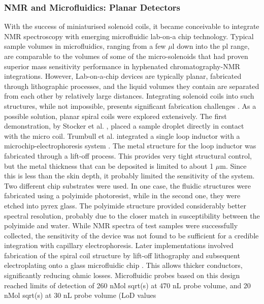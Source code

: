 \subsubsection{NMR and Microfluidics: Planar
Detectors}\label{nmr-and-microfluidics-planar-detectors}

With the success of miniaturised solenoid coils, it became conceivable
to integrate NMR spectroscopy with emerging microfluidic lab-on-a chip
technology. Typical sample volumes in microfluidics, ranging from a few
$\mu$l down into the pl range, are comparable to the volumes of some of
the micro-solenoids that had proven superior mass sensitivity
performance in hyphenated chromatography-NMR integrations. However,
Lab-on-a-chip devices are typically planar, fabricated through
lithographic processes, and the liquid volumes they contain are
separated from each other by relatively large distances. Integrating
solenoid coils into such structures, while not impossible, presents
significant fabrication challenges \cite{Badilita:2010hb}. As a possible
solution, planar spiral coils were explored extensively. The first
demonstration, by Stocker et al. \cite{Stocker:1997by}, placed a sample
droplet directly in contact with the micro coil. Trumbull et al.
integrated a single loop inductor with a microchip-electrophoresis
system \cite{Trumbull:2000vb}. The metal structure for the loop inductor
was fabricated through a lift-off process. This provides very tight
structural control, but the metal thickness that can be deposited is
limited to about 1 $\mu$m. Since this is less than the skin depth, it
probably limited the sensitivity of the system. Two different chip
substrates were used. In one case, the fluidic structures were
fabricated using a polyimide photoresist, while in the second one, they
were etched into pyrex glass. The polyimide structure provided
considerably better spectral resolution, probably due to the closer
match in susceptibility between the polyimide and water. While NMR
spectra of test samples were successfully collected, the sensitivity of
the device was not found to be sufficient for a credible integration
with capillary electrophoresis. Later implementations involved
fabrication of the spiral coil structure by lift-off lithography and
subsequent electroplating onto a glass microfluidic chip
\cite{Massin:2002bj}. This allows thicker conductors, significantly
reducing ohmic losses. Microfluidic probes based on this design
\cite{Massin:2003ty} reached limits of detection of 260 nMol sqrt(s) at 470
nL probe volume, and 20 nMol sqrt(s) at 30 nL probe volume (LoD values
